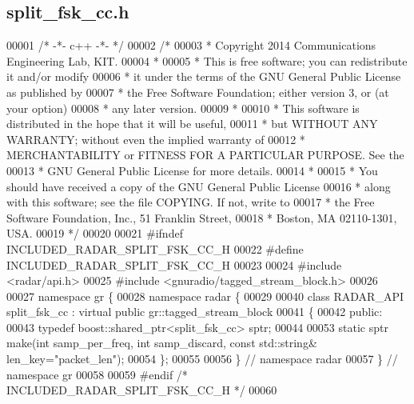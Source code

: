 \subsection{split\+\_\+fsk\+\_\+cc.\+h}
\label{split__fsk__cc_8h_source}

\begin{DoxyCode}
00001 \textcolor{comment}{/* -*- c++ -*- */}
00002 \textcolor{comment}{/* }
00003 \textcolor{comment}{ * Copyright 2014 Communications Engineering Lab, KIT.}
00004 \textcolor{comment}{ * }
00005 \textcolor{comment}{ * This is free software; you can redistribute it and/or modify}
00006 \textcolor{comment}{ * it under the terms of the GNU General Public License as published by}
00007 \textcolor{comment}{ * the Free Software Foundation; either version 3, or (at your option)}
00008 \textcolor{comment}{ * any later version.}
00009 \textcolor{comment}{ * }
00010 \textcolor{comment}{ * This software is distributed in the hope that it will be useful,}
00011 \textcolor{comment}{ * but WITHOUT ANY WARRANTY; without even the implied warranty of}
00012 \textcolor{comment}{ * MERCHANTABILITY or FITNESS FOR A PARTICULAR PURPOSE.  See the}
00013 \textcolor{comment}{ * GNU General Public License for more details.}
00014 \textcolor{comment}{ * }
00015 \textcolor{comment}{ * You should have received a copy of the GNU General Public License}
00016 \textcolor{comment}{ * along with this software; see the file COPYING.  If not, write to}
00017 \textcolor{comment}{ * the Free Software Foundation, Inc., 51 Franklin Street,}
00018 \textcolor{comment}{ * Boston, MA 02110-1301, USA.}
00019 \textcolor{comment}{ */}
00020  
00021 \textcolor{preprocessor}{#ifndef INCLUDED\_RADAR\_SPLIT\_FSK\_CC\_H}
00022 \textcolor{preprocessor}{#define INCLUDED\_RADAR\_SPLIT\_FSK\_CC\_H}
00023 
00024 \textcolor{preprocessor}{#include <radar/api.h>}
00025 \textcolor{preprocessor}{#include <gnuradio/tagged\_stream\_block.h>}
00026 
00027 \textcolor{keyword}{namespace }gr \{
00028   \textcolor{keyword}{namespace }radar \{
00029 
00040     \textcolor{keyword}{class }RADAR_API split_fsk_cc : \textcolor{keyword}{virtual} \textcolor{keyword}{public} gr::tagged\_stream\_block
00041     \{
00042      \textcolor{keyword}{public}:
00043       \textcolor{keyword}{typedef} boost::shared\_ptr<split\_fsk\_cc> sptr;
00044 
00053       \textcolor{keyword}{static} sptr make(\textcolor{keywordtype}{int} samp_per_freq, \textcolor{keywordtype}{int} samp\_discard, \textcolor{keyword}{const} std::string& len\_key=\textcolor{stringliteral}{"packet\_len"});
00054     \};
00055 
00056   \} \textcolor{comment}{// namespace radar}
00057 \} \textcolor{comment}{// namespace gr}
00058 
00059 \textcolor{preprocessor}{#endif }\textcolor{comment}{/* INCLUDED\_RADAR\_SPLIT\_FSK\_CC\_H */}\textcolor{preprocessor}{}
00060 
\end{DoxyCode}
